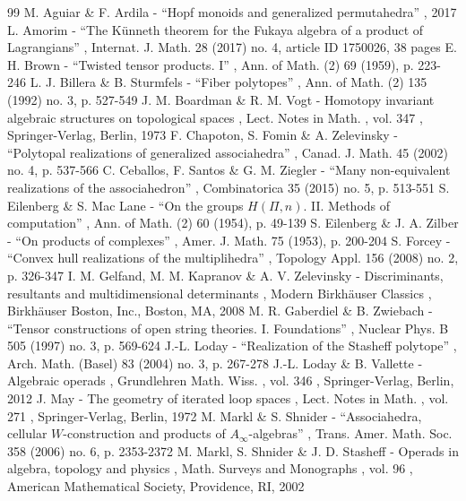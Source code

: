 \begin{thebibliography}{99}
 M. Aguiar \& F. Ardila - “Hopf monoids and generalized permutahedra” , 2017
 L. Amorim - “The Künneth theorem for the Fukaya algebra of a product of Lagrangians” , Internat. J. Math. 28 (2017) no. 4, article ID 1750026, 38 pages
 E. H. Brown - “Twisted tensor products. I” , Ann. of Math. (2) 69 (1959), p. 223-246
 L. J. Billera \& B. Sturmfels - “Fiber polytopes” , Ann. of Math. (2) 135 (1992) no. 3, p. 527-549
 J. M. Boardman \& R. M. Vogt - Homotopy invariant algebraic structures on topological spaces , Lect. Notes in Math. , vol. 347 , Springer-Verlag, Berlin, 1973
 F. Chapoton, S. Fomin \& A. Zelevinsky - “Polytopal realizations of generalized associahedra” , Canad. J. Math. 45 (2002) no. 4, p. 537-566
 C. Ceballos, F. Santos \& G. M. Ziegler - “Many non-equivalent realizations of the associahedron” , Combinatorica 35 (2015) no. 5, p. 513-551
 S. Eilenberg \& S. Mac Lane - “On the groups $H(\Pi ,n)$. II. Methods of computation” , Ann. of Math. (2) 60 (1954), p. 49-139
 S. Eilenberg \& J. A. Zilber - “On products of complexes” , Amer. J. Math. 75 (1953), p. 200-204
 S. Forcey - “Convex hull realizations of the multiplihedra” , Topology Appl. 156 (2008) no. 2, p. 326-347
 I. M. Gelfand, M. M. Kapranov \& A. V. Zelevinsky - Discriminants, resultants and multidimensional determinants , Modern Birkhäuser Classics , Birkhäuser Boston, Inc., Boston, MA, 2008
 M. R. Gaberdiel \& B. Zwiebach - “Tensor constructions of open string theories. I. Foundations” , Nuclear Phys. B 505 (1997) no. 3, p. 569-624
 J.-L. Loday - “Realization of the Stasheff polytope” , Arch. Math. (Basel) 83 (2004) no. 3, p. 267-278
 J.-L. Loday \& B. Vallette - Algebraic operads , Grundlehren Math. Wiss. , vol. 346 , Springer-Verlag, Berlin, 2012
 J. May - The geometry of iterated loop spaces , Lect. Notes in Math. , vol. 271 , Springer-Verlag, Berlin, 1972
 M. Markl \& S. Shnider - “Associahedra, cellular $W$-construction and products of $A_\infty $-algebras” , Trans. Amer. Math. Soc. 358 (2006) no. 6, p. 2353-2372
 M. Markl, S. Shnider \& J. D. Stasheff - Operads in algebra, topology and physics , Math. Surveys and Monographs , vol. 96 , American Mathematical Society, Providence, RI, 2002

\end{thebibliography}
